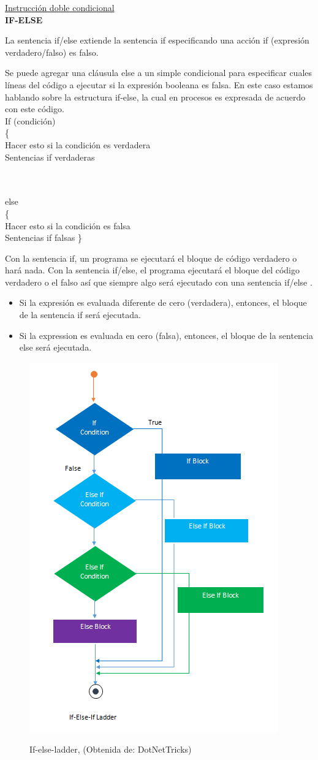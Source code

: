 \documentclass[11pt, letterpaper, spanish]{article}
\begin{document}
{{{\underline{Instrucción doble condicional}
\\
\textbf{IF-ELSE}
\par{La sentencia if/else extiende la sentencia if especificando una acción if (expresión verdadero/falso) es falso.}
\par{Se puede agregar una cláusula else a un simple condicional para especificar cuales líneas del código a ejecutar si la expresión booleana es falsa. En este caso estamos hablando sobre la estructura if-else, la cual en procesos es expresada de acuerdo con este código.}
\\
If (condición)\\
\{\\
Hacer esto si la condición es verdadera\\
Sentencias if verdaderas\\
\\}\\
else\\
\{\\
Hacer esto si la condición es falsa\\
Sentencias if falsas
\}
\par{Con la sentencia if, un programa se ejecutará el bloque de código verdadero o hará nada. Con la sentencia if/else, el programa ejecutará el bloque del código verdadero o el falso así que siempre algo será ejecutado con una sentencia if/else \cite{iscyp_2017}.}
\begin{itemize}
    \item {Si la expresión es evaluada diferente de cero (verdadera), entonces, el bloque de la sentencia if será ejecutada.}
    \item{Si la expression es evaluada en cero (falsa), entonces, el bloque de la sentencia else será ejecutada.}
\end{itemize}
\begin{figure}
	    \centering
		\caption{If-else-ladder, (Obtenida de: {DotNetTricks})}
		\includegraphics[width=0.2 \textwidth]{if-else-if ladder.png}
		\label{Imagen_If-else}
	\end{figure}
\vspace{0.5 cm}
}}
\end{document}
